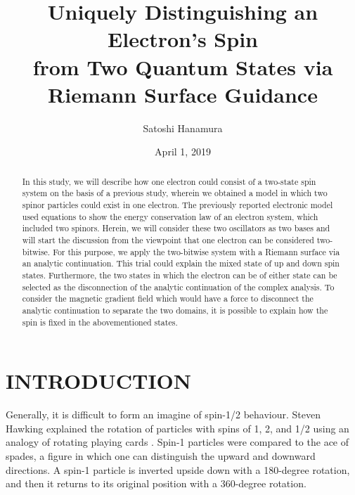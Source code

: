 \documentclass[reprint,amsmath,amssymb,aps,]{revtex4-1}
\numberwithin{equation}{section}%
\begin{document}
    \title{Uniquely Distinguishing an Electron's Spin \\
            from Two Quantum States via Riemann Surface Guidance}
    \author{Satoshi Hanamura}
        \date{April 1, 2019}
        \begin{abstract}
        In this study, we will describe how one electron could consist of a two-state spin system on the basis of a previous study, wherein we obtained a model in which two spinor particles could exist in one electron. The previously reported electronic model used equations to show the energy conservation law of an electron system, which included two spinors. Herein, we will consider these two oscillators as two bases and will start the discussion from the viewpoint that one electron can be considered two-bitwise. For this purpose, we apply the two-bitwise system with a Riemann surface via an analytic continuation. This trial could explain the mixed state of up and down spin states. Furthermore, the two states in which the electron can be of either state can be selected as the disconnection of the analytic continuation of the complex analysis. To consider the magnetic gradient field which would have a force to disconnect the analytic continuation to separate the two domains, it is possible to explain how the spin is fixed in the abovementioned states.
        
        \end{abstract}
    \maketitle

\section{\label{sec:INTRODUCTION}INTRODUCTION}


    Generally, it is difficult to form an imagine of spin-1/2 behaviour. Steven Hawking explained the rotation of particles with spins of 1, 2, and 1/2 using an analogy of rotating playing cards \cite{Hawking}. Spin-1 particles were compared to the ace of spades, a figure in which one can distinguish the upward and downward directions. A spin-1 particle is inverted upside down with a 180-degree rotation, and then it returns to its original position with a 360-degree rotation.
    
\end{document}
